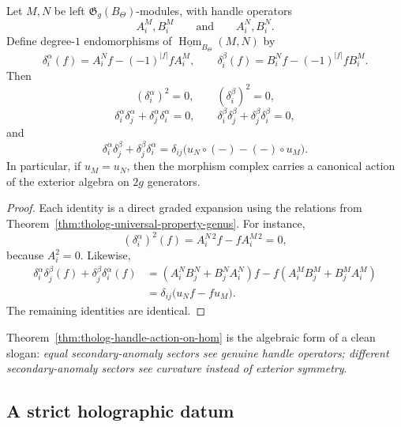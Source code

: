 \begin{theorem}
Let \(M,N\) be left \(\mathfrak{G}_{g}(B_{\Theta})\)-modules, with handle operators
\[
A_{i}^{M},B_{i}^{M}
\qquad\text{and}\qquad
A_{i}^{N},B_{i}^{N}.
\]
Define degree-\(1\) endomorphisms of \(\underline{\operatorname{Hom}}_{B_{\Theta}}(M,N)\) by
\[
\delta_{i}^{\alpha}(f)=A_{i}^{N}f-(-1)^{|f|}fA_{i}^{M},
\qquad
\delta_{i}^{\beta}(f)=B_{i}^{N}f-(-1)^{|f|}fB_{i}^{M}.
\]
Then
\[
(\delta_{i}^{\alpha})^{2}=0,\qquad
(\delta_{i}^{\beta})^{2}=0,
\]
\[
\delta_{i}^{\alpha}\delta_{j}^{\alpha}+\delta_{j}^{\alpha}\delta_{i}^{\alpha}=0,
\qquad
\delta_{i}^{\beta}\delta_{j}^{\beta}+\delta_{j}^{\beta}\delta_{i}^{\beta}=0,
\]
and
\[
\delta_{i}^{\alpha}\delta_{j}^{\beta}+\delta_{j}^{\beta}\delta_{i}^{\alpha}
=
\delta_{ij}\big(u_{N}\circ(-)-(-)\circ u_{M}\big).
\]
In particular, if \(u_{M}=u_{N}\), then the morphism complex carries a canonical action of the exterior algebra on \(2g\) generators.
\end{theorem}

\begin{proof}
Each identity is a direct graded expansion using the relations from Theorem~\ref{thm:tholog-universal-property-genus}.
For instance,
\[
(\delta_{i}^{\alpha})^{2}(f)=A_{i}^{N\,2}f-fA_{i}^{M\,2}=0,
\]
because \(A_{i}^{2}=0\).
Likewise,
\begin{align*}
\delta_{i}^{\alpha}\delta_{j}^{\beta}(f)+\delta_{j}^{\beta}\delta_{i}^{\alpha}(f)
&=
(A_{i}^{N}B_{j}^{N}+B_{j}^{N}A_{i}^{N})f
-
f(A_{i}^{M}B_{j}^{M}+B_{j}^{M}A_{i}^{M})
\\
&=
\delta_{ij}\big(u_{N}f-fu_{M}\big).
\end{align*}
The remaining identities are identical.
\end{proof}

\begin{remark}
Theorem~\ref{thm:tholog-handle-action-on-hom} is the algebraic form of a clean slogan:
\emph{equal secondary-anomaly sectors see genuine handle operators; different secondary-anomaly sectors see curvature instead of exterior symmetry}.
\end{remark}

\subsection{A strict holographic datum}

